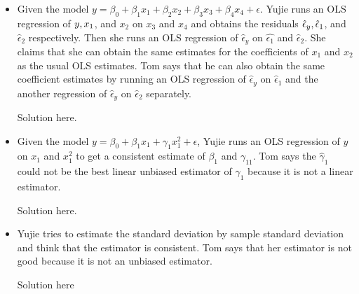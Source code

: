 \documentclass[11pt]{SelfArxOneColBMN}
\begin{document}
\begin{exercise}
	\begin{itemize}
		\item Given the model $y = \beta_0 + \beta_1x_1 + \beta_2x_2 + \beta_3x_3 + \beta_4x_4 + \epsilon$. Yujie runs an OLS regression of $y,\space x_1$, and $x_2$ on $x_3$ and $x_4$ and obtains the residuals $\hat{\epsilon}_y, \space \hat{\epsilon}_1$, and $\hat{\epsilon}_2$ respectively. Then she runs an OLS regression of $\hat{\epsilon}_y$ on $\hat{\epsilon_1}$ and $\hat{\epsilon}_2$. She claims that she can obtain the same estimates for the coefficients of $x_1$ and $x_2$ as the usual OLS estimates. Tom says that he can also obtain the same coefficient estimates by running an OLS regression of $\hat{\epsilon}_y$ on $\hat{\epsilon}_1$ and the another regression of $\hat{\epsilon}_y$ on $\hat{\epsilon}_2$ separately.
		\begin{solution}
			Solution here.
		\end{solution}
		\item Given the model $y = \beta_0 + \beta_1x_1 + \gamma_1x_1^2 + \epsilon$, Yujie runs an OLS regression of $y$ on $x_1$ and $x_1^2$ to get a consistent estimate of $\beta_1$ and $\gamma_11$. Tom says the $\hat{\gamma}_1$ could not be the best linear unbiased estimator of $\gamma_1$ because it is not a linear estimator.
		\begin{solution}
			Solution here.
		\end{solution}
		\item Yujie tries to estimate the standard deviation by sample standard deviation and think that the estimator is consistent. Tom says that her estimator is not good because it is not an unbiased estimator. 
		\begin{solution}
			Solution here
		\end{solution}
	\end{itemize}
\end{exercise}
\end{document}
